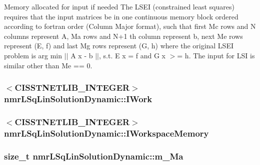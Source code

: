 Memory allocated for input if needed The L\-S\-E\-I (constrained least squares) requires that the input matrices be in one continuous memory block ordered according to fortran order (Column Major format), such that first Mc rows and N columns represent A, Ma rows and N+1 th column represent b, next Me rows represent (E, f) and last Mg rows represent (G, h) where the original L\-S\-E\-I problem is arg min $\vert$$\vert$ A x -\/ b $\vert$$\vert$, s.\-t. E x = f and G x $>$= h. The input for L\-S\-I is similar other than Me == 0. \hypertarget{classnmr_l_sq_lin_solution_dynamic_a19d6282ccc51cf567872e789d8c29596}{
\subsubsection[{I\-Work}]{$<$C\-I\-S\-S\-T\-N\-E\-T\-L\-I\-B\-\_\-\-I\-N\-T\-E\-G\-E\-R$>$ nmr\-L\-Sq\-Lin\-Solution\-Dynamic\-::\-I\-Work\hspace{0.3cm}{\ttfamily [protected]}}}\label{classnmr_l_sq_lin_solution_dynamic_a19d6282ccc51cf567872e789d8c29596}
\hypertarget{classnmr_l_sq_lin_solution_dynamic_a5d42d35b6d178d1cdfc61c15af11a512}{
\subsubsection[{I\-Workspace\-Memory}]{$<$C\-I\-S\-S\-T\-N\-E\-T\-L\-I\-B\-\_\-\-I\-N\-T\-E\-G\-E\-R$>$ nmr\-L\-Sq\-Lin\-Solution\-Dynamic\-::\-I\-Workspace\-Memory\hspace{0.3cm}{\ttfamily [protected]}}}\label{classnmr_l_sq_lin_solution_dynamic_a5d42d35b6d178d1cdfc61c15af11a512}
\hypertarget{classnmr_l_sq_lin_solution_dynamic_af4d36bff68292f11c394e3b25f72ec5a}{
\subsubsection[{m\-\_\-\-Ma}]{\setlength{\rightskip}{0pt plus 5cm}size\-\_\-t nmr\-L\-Sq\-Lin\-Solution\-Dynamic\-::m\-\_\-\-Ma\hspace{0.3cm}{\ttfamily [protected]}}}\label{classnmr_l_sq_lin_solution_dynamic_af4d36bff68292f11c394e3b25f72ec5a}

